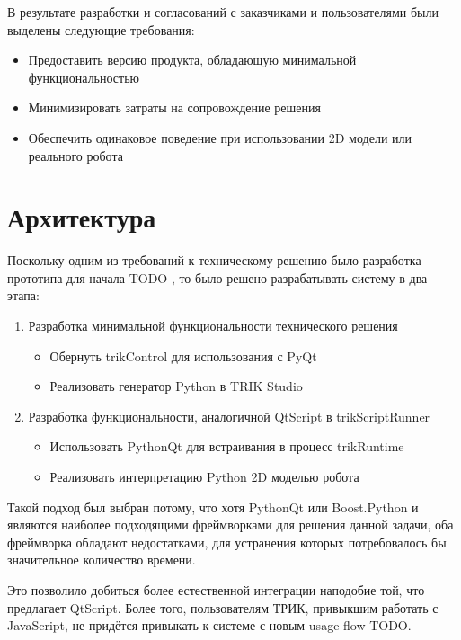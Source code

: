 \documentclass[14pt]{matmex-diploma-custom}
\begin{document}
В результате разработки и согласований с заказчиками и пользователями были выделены следующие требования:
\begin{itemize}
    \item Предоставить версию продукта, обладающую минимальной функциональностью
    \item Минимизировать затраты на сопровождение решения
    \item Обеспечить одинаковое поведение при использовании 2D модели или реального робота
\end{itemize}



\section{Архитектура}

Поскольку одним из требований к техническому решению было разработка прототипа для начала TODO , то было решено разрабатывать систему в два этапа:
\begin{enumerate}
    \item Разработка минимальной функциональности технического решения
    \begin{itemize}
        \item Обернуть trikControl для использования с PyQt
        \item Реализовать генератор Python в TRIK Studio
    \end{itemize}
    \item Разработка функциональности, аналогичной QtScript в trikScriptRunner
    \begin{itemize}
        \item Использовать PythonQt для встраивания в процесс trikRuntime
        \item Реализовать интерпретацию Python 2D моделью робота
    \end{itemize}
\end{enumerate} 

Такой подход был выбран потому, что хотя PythonQt или Boost.Python и являются наиболее подходящими фреймворками для решения данной задачи, оба фреймворка обладают недостатками, для устранения которых потребовалось бы значительное количество времени. 

Это позволило добиться более естественной интеграции наподобие той, что предлагает QtScript. Более того, пользователям ТРИК, привыкшим работать с JavaScript, не придётся привыкать к системе с новым usage flow TODO. 
\end{document}

